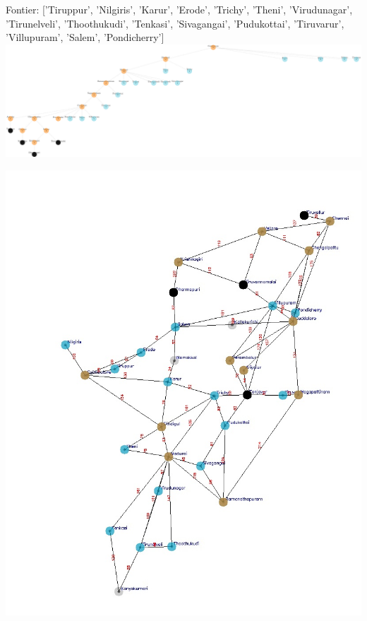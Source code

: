 \documentclass[xcolor=table]{beamer}
\begin{document}
\begin{frame}
  { \tiny Fontier: ['Tiruppur', 'Nilgiris', 'Karur', 'Erode', 'Trichy', 'Theni', 'Virudunagar', 'Tirunelveli', 'Thoothukudi', 'Tenkasi', 'Sivagangai', 'Pudukottai', 'Tiruvarur', 'Villupuram', 'Salem', 'Pondicherry']}
  \includegraphics[width=1\textwidth]{../DFSNodes/22-1.png}
  \begin{center}
    \includegraphics[height=0.45\textheight]{../DFSoutput/tamilDFS20.jpg}
  \end{center}
\end{frame}
\end{document}
